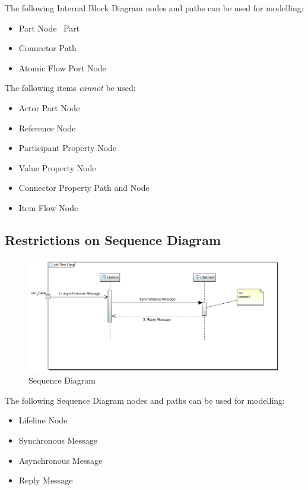 The following Internal Block Diagram nodes and paths can be used for
modelling:
\begin{itemize}
\item Part Node ~\textsf{Part}
\item Connector Path 
\item Atomic Flow Port Node 
   
\end{itemize}

The following items \emph{cannot} be used:
\begin{itemize}
\item Actor Part Node
\item Reference Node
\item Participant Property Node
\item Value Property Node
\item Connector Property Path and Node
\item Item Flow Node
\end{itemize}

\subsection{Restrictions on Sequence Diagram}



\begin{figure}[ht]
  \centering
  \includegraphics[width=\textwidth]{images/SequenceDiagram.PNG}
  \caption{Sequence Diagram}
  \label{fig:sd}
\end{figure}


The following Sequence Diagram nodes and paths can be used for
modelling:
\begin{itemize}
\item Lifeline Node 
\item Synchronous Message 
\item Asynchronous Message 
\item Reply Message 
\end{itemize}

